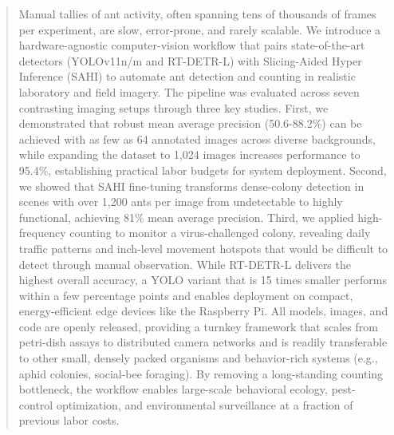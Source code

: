 \begin{abstract}

    Manual tallies of ant activity, often spanning tens of thousands of frames per experiment, are slow, error-prone, and rarely scalable. We introduce a hardware-agnostic computer-vision workflow that pairs state-of-the-art detectors (YOLOv11n/m and RT-DETR-L) with Slicing-Aided Hyper Inference (SAHI) to automate ant detection and counting in realistic laboratory and field imagery.
    The pipeline was evaluated across seven contrasting imaging setups through three key studies. First, we demonstrated that robust mean average precision (50.6-88.2\%) can be achieved with as few as 64 annotated images across diverse backgrounds, while expanding the dataset to 1,024 images increases performance to 95.4\%, establishing practical labor budgets for system deployment. Second, we showed that SAHI fine-tuning transforms dense-colony detection in scenes with over 1,200 ants per image from undetectable to highly functional, achieving 81\% mean average precision. Third, we applied high-frequency counting to monitor a virus-challenged colony, revealing daily traffic patterns and inch-level movement hotspots that would be difficult to detect through manual observation. While RT-DETR-L delivers the highest overall accuracy, a YOLO variant that is 15 times smaller performs within a few percentage points and enables deployment on compact, energy-efficient edge devices like the Raspberry Pi.
    All models, images, and code are openly released, providing a turnkey framework that scales from petri-dish assays to distributed camera networks and is readily transferable to other small, densely packed organisms and behavior-rich systems (e.g., aphid colonies, social-bee foraging). By removing a long-standing counting bottleneck, the workflow enables large-scale behavioral ecology, pest-control optimization, and environmental surveillance at a fraction of previous labor costs.

\end{abstract}



